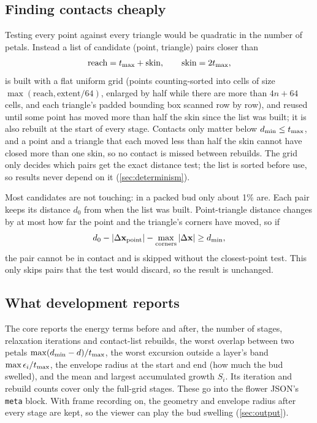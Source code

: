 \subsection{Finding contacts cheaply}
Testing every point against every triangle would be quadratic in the number of
petals. Instead a list of candidate (point, triangle) pairs closer than
\[
  \text{reach} = t_{\max} + \text{skin}, \qquad \text{skin} = 2t_{\max},
\]
is built with a flat uniform grid (points counting-sorted into cells of size
$\max(\text{reach}, \text{extent}/64)$, enlarged by half while there are more
than $4n+64$ cells, and each triangle's padded bounding box scanned row by
row), and reused until some point has moved more than
half the skin since the list was built; it is also rebuilt at the start of
every stage. Contacts only matter below $d_{\min}\le t_{\max}$, and a point and a
triangle that each moved less than half the skin cannot have closed more than
one skin, so no contact is missed between rebuilds. The grid only decides
which pairs get the exact distance test; the list is sorted before use, so
results never depend on it (\cref{sec:determinism}).

Most candidates are not touching: in a packed bud only about 1\% are. Each
pair keeps its distance $d_0$ from when the list was built. Point-triangle
distance changes by at most how far the point and the triangle's corners have
moved, so if
\[
  d_0 - |\Delta\mathbf{x}_{\text{point}}| - \max_{\text{corners}} |\Delta\mathbf{x}| \ge d_{\min},
\]
the pair cannot be in contact and is skipped without the closest-point test.
This only skips pairs that the test would discard, so the result is unchanged.

\subsection{What development reports}
The core reports the energy terms before and after, the number of stages,
relaxation iterations and contact-list rebuilds, the worst overlap between two
petals $\max(d_{\min} - d)/t_{\max}$, the worst excursion outside a layer's band
$\max\epsilon_i/t_{\max}$, the envelope radius at the start and end (how much the
bud swelled), and the mean and largest accumulated growth $S_i$. Its
iteration and rebuild counts cover only the full-grid stages. These go into
the flower JSON's \texttt{meta} block. With frame recording on, the geometry and
envelope radius after every stage are kept, so the viewer can play the bud
swelling (\cref{sec:output}).

